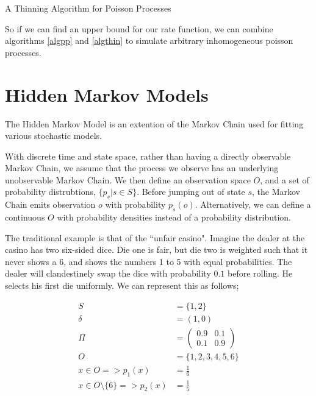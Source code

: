 \begin{algorithm}
\SetAlgoLined
{}

\caption{A Thinning Algorithm for Poisson Processes}\label{algthin}

\end{algorithm}

So if we can find an upper bound for our rate function, we can combine algorithms \ref{algpp} and \ref{algthin} to simulate arbitrary inhomogeneous poisson processes.

\section{Hidden Markov Models}

The Hidden Markov Model is an extention of the Markov Chain used for fitting various stochastic models.

With discrete time and state space, rather than having a directly observable Markov Chain, we assume that the process we observe has an underlying unobservable Markov Chain. We then define an observation space $O$, and a set of probability distrubtions, $\{p_s | s \in S\}$. Before jumping out of state $s$, the Markov Chain emits observation $o$ with probability $p_s(o)$. Alternatively, we can define a continuous $O$ with probability densities instead of a probability distribution.

The traditional example is that of the ``unfair casino". Imagine the dealer at the casino has two six-sided dice. Die one is fair, but die two is weighted such that it never shows a 6, and shows the numbers 1 to 5 with equal probabilities. The dealer will clandestinely swap the dice with probability $0.1$ before rolling. He selects his first die uniformly. We can represent this as follows;

\begin{align*}
S &= \{1,2\}\\
\delta &= (1,0)\\
\Pi &= 
\left(
	\begin{matrix}
	0.9 & 0.1 \\
	0.1 & 0.9
	\end{matrix}
\right)\\
O &= \{1,2,3,4,5,6\}\\
x \in O => p_1(x) &= \frac{1}{6}\\
x \in O \setminus \{6\} => p_2(x) &= \frac{1}{5}
\end{align*}

